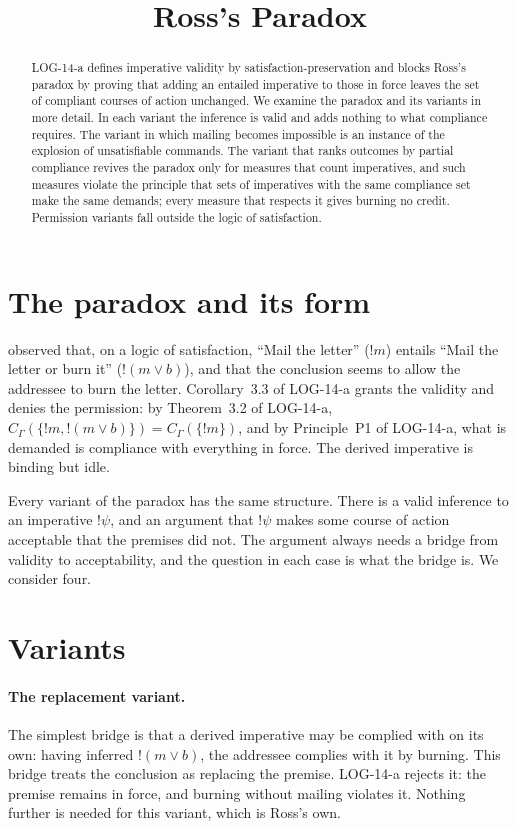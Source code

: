 \documentclass{situationist-preprint}
\title{Ross's Paradox}
\begin{document}
\maketitle

\begin{abstract}
LOG-14-a defines imperative validity by satisfaction-preservation and blocks Ross's paradox by proving that adding an entailed imperative to those in force leaves the set of compliant courses of action unchanged. We examine the paradox and its variants in more detail. In each variant the inference is valid and adds nothing to what compliance requires. The variant in which mailing becomes impossible is an instance of the explosion of unsatisfiable commands. The variant that ranks outcomes by partial compliance revives the paradox only for measures that count imperatives, and such measures violate the principle that sets of imperatives with the same compliance set make the same demands; every measure that respects it gives burning no credit. Permission variants fall outside the logic of satisfaction.
\end{abstract}

\section{The paradox and its form}

\citet{Ross1941} observed that, on a logic of satisfaction, \enquote{Mail the letter} ($!m$) entails \enquote{Mail the letter or burn it} ($!(m \vee b)$), and that the conclusion seems to allow the addressee to burn the letter. Corollary~3.3 of LOG-14-a grants the validity and denies the permission: by Theorem~3.2 of LOG-14-a, $C_\Gamma(\{!m, !(m \vee b)\}) = C_\Gamma(\{!m\})$, and by Principle~P1 of LOG-14-a, what is demanded is compliance with everything in force. The derived imperative is binding but idle.

Every variant of the paradox has the same structure. There is a valid inference to an imperative $!\psi$, and an argument that $!\psi$ makes some course of action acceptable that the premises did not. The argument always needs a bridge from validity to acceptability, and the question in each case is what the bridge is. We consider four.

\section{Variants}

\paragraph{The replacement variant.} The simplest bridge is that a derived imperative may be complied with on its own: having inferred $!(m \vee b)$, the addressee complies with it by burning. This bridge treats the conclusion as replacing the premise. LOG-14-a rejects it: the premise remains in force, and burning without mailing violates it. Nothing further is needed for this variant, which is Ross's own.
\end{document}
